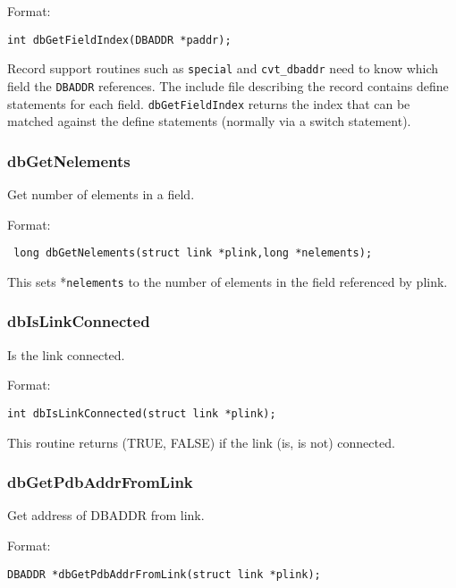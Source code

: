Format:

\begin{verbatim}
int dbGetFieldIndex(DBADDR *paddr);
\end{verbatim}

Record support routines such as \verb|special| and \verb|cvt_dbaddr| need to know which field the \verb|DBADDR| references. The 
include file describing the record contains define statements for each field. \verb|dbGetFieldIndex| returns the index that 
can be matched against the define statements (normally via a switch statement).

\subsubsection{dbGetNelements}

Get number of elements in a field.

Format:

\begin{verbatim}
 long dbGetNelements(struct link *plink,long *nelements);
\end{verbatim}

This sets *\verb|nelements| to the number of elements in the field referenced by plink.

\subsubsection{dbIsLinkConnected}

Is the link connected.

Format:

\begin{verbatim}
int dbIsLinkConnected(struct link *plink);
\end{verbatim}

This routine returns (TRUE, FALSE) if the link (is, is not) connected.

\subsubsection{dbGetPdbAddrFromLink}

Get address of DBADDR from link.

Format:

\begin{verbatim}
DBADDR *dbGetPdbAddrFromLink(struct link *plink);
\end{verbatim}

